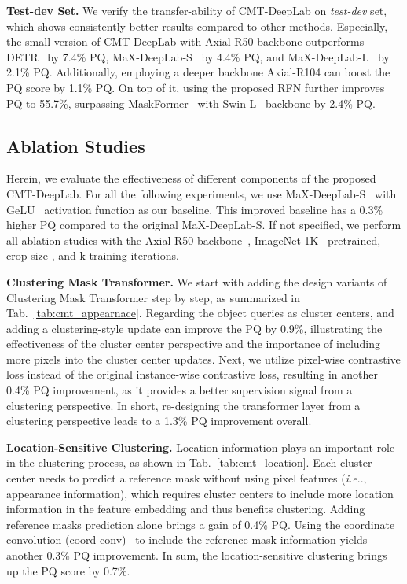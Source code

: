 \documentclass[10pt,twocolumn,letterpaper]{article}
\makeatletter
\DeclareRobustCommand\onedot{\futurelet\@let@token\@onedot}
\def\@onedot{\ifx\@let@token.\else.\null\fi\xspace}
\def\ie{\emph{i.e}\onedot} \def\Ie{\emph{I.e}\onedot}
\makeatother
\begin{document}
\vspace{0.5ex}
\noindent\textbf{Test-dev Set.} We verify the transfer-ability of CMT-DeepLab on \textit{test-dev} set, which shows consistently better results compared to other methods. Especially, the small version of CMT-DeepLab with Axial-R50 backbone outperforms DETR~\cite{carion2020end} by 7.4\% PQ, MaX-DeepLab-S~\cite{wang2021max} by 4.4\% PQ, and MaX-DeepLab-L~\cite{wang2021max} by 2.1\% PQ. Additionally, employing a deeper backbone Axial-R104 can boost the PQ score by 1.1\% PQ. On top of it, using the proposed RFN further improves PQ to 55.7\%, surpassing MaskFormer~\cite{cheng2021per} with Swin-L~\cite{liu2021swin} backbone by 2.4\% PQ.

\subsection{Ablation Studies}
Herein, we evaluate the effectiveness of different components of the proposed CMT-DeepLab. For all the following experiments, we use MaX-DeepLab-S~\cite{wang2021max} with GeLU~\cite{hendrycks2016gaussian} activation function as our baseline. This improved baseline has a 0.3\% higher PQ compared to the original MaX-DeepLab-S. If not specified, we perform all ablation studies with the Axial-R50 backbone~\cite{he2016deep,wang2020axial}, ImageNet-1K~\cite{russakovsky2015imagenet} pretrained, crop size , and k training iterations.

\vspace{0.5ex}
\noindent\textbf{Clustering Mask Transformer.} We start with adding the design variants of Clustering Mask Transformer step by step, as summarized in Tab.~\ref{tab:cmt_appearnace}.
Regarding the object queries as cluster centers, and adding a clustering-style update can improve the PQ by 0.9\%, illustrating the effectiveness of the cluster center perspective and the importance of including more pixels into the cluster center updates. Next, we utilize pixel-wise contrastive loss instead of the original instance-wise contrastive loss, resulting in another 0.4\% PQ improvement, as it provides a better supervision signal from a clustering perspective. In short, re-designing the transformer layer from a clustering perspective leads to a 1.3\% PQ improvement overall.

\vspace{0.5ex}
\noindent\textbf{Location-Sensitive Clustering.} Location information plays an important role in the clustering process, as shown in Tab.~\ref{tab:cmt_location}. Each cluster center needs to predict a reference mask without using pixel features (\ie, appearance information), which requires cluster centers to include more location information in the feature embedding and thus benefits clustering. Adding reference masks prediction alone brings a gain of 0.4\% PQ.
Using the coordinate convolution (coord-conv)~\cite{liu2018intriguing} to include the reference mask information yields another 0.3\% PQ improvement.
In sum, the location-sensitive clustering brings up the PQ score by 0.7\%.
\end{document}

